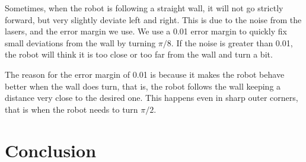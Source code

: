 \documentclass[10pt,journal,compsoc]{IEEEtran}
\begin{document}
Sometimes, when the robot is following a straight wall, it will not go strictly forward, but very slightly deviate left and right. This is due to the noise from the lasers, and the error margin we use. We use a 0.01 error margin to quickly fix small deviations from the wall by turning $\pi/8$. If the noise is greater than 0.01, the robot will think it is too close or too far from the wall and turn a bit.

The reason for the error margin of 0.01 is because it makes the robot behave better when the wall does turn, that is, the robot follows the wall keeping a distance very close to the desired one. This happens even in sharp outer corners, that is when the robot needs to turn $\pi/2$.


\section{Conclusion}



\ifCLASSOPTIONcaptionsoff
  \newpage
\fi



\end{document}
